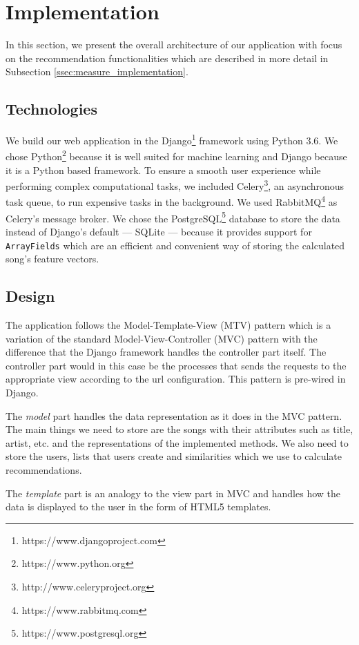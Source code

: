 \section{Implementation}\label{sec:implementation}
In this section, we present the overall architecture of our application with focus on the recommendation functionalities which are described in more detail in Subsection \ref{ssec:measure_implementation}. 

\subsection{Technologies}

We build our web application in the Django\footnote{https://www.djangoproject.com} framework using Python 3.6. We chose Python\footnote{https://www.python.org} because it is well suited for machine learning and Django because it is a Python based framework. To ensure a smooth user experience while performing complex computational tasks, we included Celery\footnote{http://www.celeryproject.org}, an asynchronous task queue, to run expensive tasks in the background. We used RabbitMQ\footnote{https://www.rabbitmq.com} as Celery's message broker. We chose the PostgreSQL\footnote{https://www.postgresql.org} database to store the data instead of Django's default --- SQLite --- because it provides support for \texttt{ArrayFields} which are an efficient and convenient way of storing the calculated song's feature vectors.

\subsection{Design}
The application follows the Model-Template-View (MTV) pattern which is a variation of the standard Model-View-Controller (MVC) pattern with the difference that the Django framework handles the controller part itself. The controller part would in this case be the processes that sends the requests to the appropriate view according to the url configuration.
This pattern is pre-wired in Django.

The \textit{model} part handles the data representation as it does in the MVC pattern. The main things we need to store are the songs with their attributes such as title, artist, etc. and the representations of the implemented methods. We also need to store the users, lists that users create and similarities which we use to calculate recommendations.

The \textit{template} part is an analogy to the view part in MVC and handles how the data is displayed to the user in the form of HTML5 templates.

